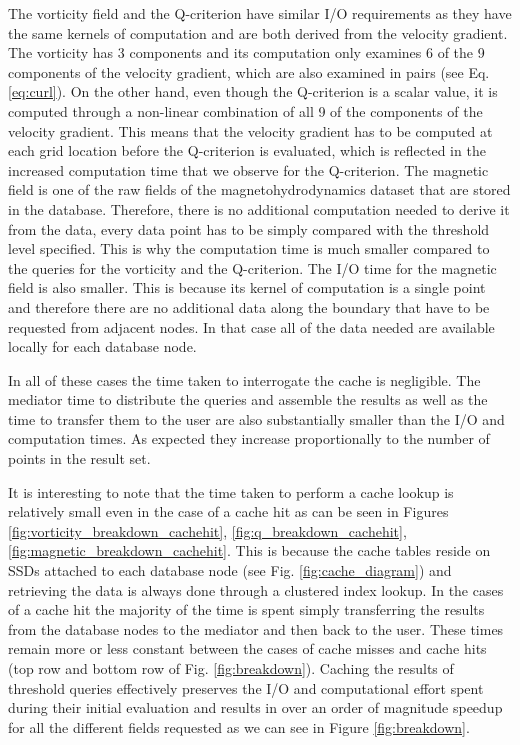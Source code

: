 \documentclass{sig-alternate}
\begin{document}
The vorticity field and the Q-criterion have similar I/O requirements as they
have the same kernels of computation and are both derived from the velocity gradient. The vorticity has 3 components and its computation only examines
6 of the 9 components of the velocity gradient, which are also examined in pairs (see Eq. \ref{eq:curl}). On the other hand, even though the Q-criterion is a
scalar value, it is computed through a non-linear combination of all 9 of the components of the velocity gradient. This means that the velocity gradient has
to be computed at each grid location before the Q-criterion is evaluated, which is reflected in the increased computation time that we observe for the
Q-criterion. The magnetic field is one of the raw fields of the magnetohydrodynamics dataset that are stored in the database. Therefore, there is no
additional computation needed to derive it from the data, every data point has to be simply compared with the threshold level specified. This is why the 
computation time is much smaller compared to the queries for the vorticity and the Q-criterion. The I/O time for the magnetic field is also smaller. This is
because its kernel of computation is a single point and therefore there are no additional data along the boundary that have to be requested from adjacent 
nodes. In that case all of the data needed are available locally for each database node.

In all of these cases the time taken to interrogate the cache is negligible. The mediator time to distribute the queries and assemble the results as well as the
time to transfer them to the user are also substantially smaller than the I/O and computation times. As expected they increase proportionally to the number
of points in the result set.

It is interesting to note that the time taken to perform a cache lookup is relatively small even in the case of a cache hit as can be seen in Figures 
\ref{fig:vorticity_breakdown_cachehit}, \ref{fig:q_breakdown_cachehit}, \ref{fig:magnetic_breakdown_cachehit}. This is because the cache tables reside on
SSDs attached to each database node (see Fig. \ref{fig:cache_diagram}) and retrieving the data is always done through a clustered index lookup.
In the cases of a cache hit the majority of the time is spent simply transferring the results from the database nodes to the mediator and then back to the user.
These times remain more or less constant between the cases of cache misses and cache hits (top row and bottom row of Fig. \ref{fig:breakdown}).
Caching the results of threshold queries
effectively preserves the I/O and computational effort spent during their initial evaluation and results in over an order of magnitude speedup for all the
different fields requested as we can see in Figure \ref{fig:breakdown}.
\end{document}
